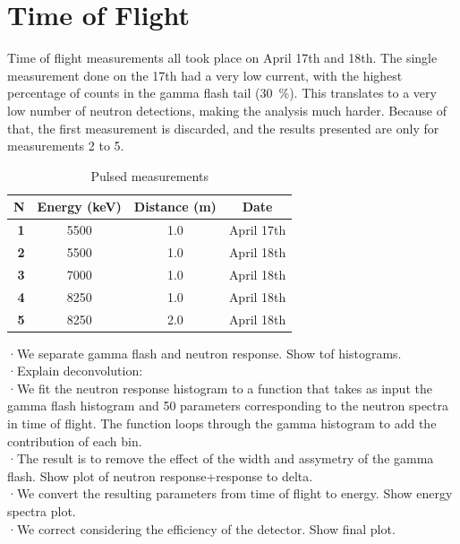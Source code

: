 \documentclass[a4paper,12pt]{report}
\begin{document}
\section{Time of Flight}
Time of flight measurements all took place on April 17th and 18th.
The single measurement done on the 17th had a very low current, with the highest percentage of counts in the gamma flash tail (\qty{30}{\percent}).
This translates to a very low number of neutron detections, making the analysis much harder.
Because of that, the first measurement is discarded, and the results presented are only for measurements 2 to 5.

\begin{table}[H]	%
\centering
\begin{tabular}[c]{>{\bfseries}r||c|c|c}
	N& Energy (\unit{\keV}) & Distance (\unit{\meter}) & Date\tablefootnote{All took place in 2023} \\ \hline	%
	1&\num{5500}&\num{1.0}&April 17th\\ \hline
	2&\num{5500}&\num{1.0}&April 18th\\ \hline
	3&\num{7000}&\num{1.0}&April 18th\\ \hline
	4&\num{8250}&\num{1.0}&April 18th\\ \hline
	5&\num{8250}&\num{2.0}&April 18th\\ \hline
\end{tabular}
\caption{Pulsed measurements}
\label{pulsed_measurements_table}
\end{table}

·We separate gamma flash and neutron response. Show tof histograms.\\
·Explain deconvolution:\\
·We fit the neutron response histogram to a function that takes as input the gamma flash histogram and 50 parameters corresponding to the neutron spectra in time of flight. The function loops through the gamma histogram to add the contribution of each bin.\\
·The result is to remove the effect of the width and assymetry of the gamma flash. Show plot of neutron response+response to delta.\\

·We convert the resulting parameters from time of flight to energy. Show energy spectra plot.\\
·We correct considering the efficiency of the detector. Show final plot.\\
\end{document}
